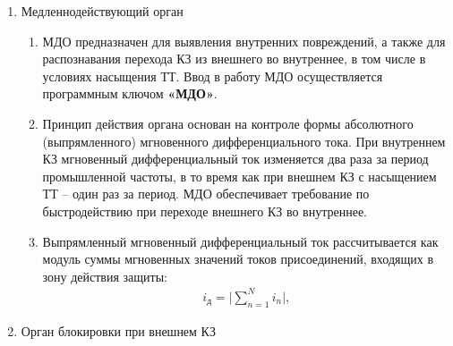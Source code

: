 \begin{enumerate}[label=\arabic{section}.\arabic{subsection}.\arabic{enumi}, labelsep=4pt, leftmargin=0pt, itemindent=57pt, itemsep=0pt, parsep=5pt]
\begin{enumerate}[label=\arabic{section}.\arabic{subsection}.\arabic{enumi}.\arabic*, labelsep=4pt, leftmargin=0em, itemindent=65pt, parsep=0pt]
\item
В алгоритме БДО реализована логика выявления одновременного нарастания фронтов действующих значений дифференциального и тормозного токов.
Сигнал срабатывания БДО формируется при наличии превышении дифференциального тока уставки срабатывания ДОТХ и нарастанием фронтов дифференциального и тормозного токов в пределах заданного времени.

\end{enumerate}


\item Медленнодействующий орган

\begin{enumerate}[label=\arabic{section}.\arabic{subsection}.\arabic{enumi}.\arabic*, labelsep=4pt, leftmargin=0em, itemindent=65pt, parsep=0pt]

\item
МДО предназначен для выявления внутренних повреждений, а также для распознавания перехода КЗ из внешнего во внутреннее, в том числе в условиях насыщения ТТ.
Ввод в работу МДО осуществляется программным ключом \textbf{«МДО»}.

\item
Принцип действия органа основан на контроле формы абсолютного (выпрямленного) мгновенного дифференциального тока.
При внутреннем КЗ мгновенный дифференциальный ток изменяется два раза за период промышленной частоты, в то время как при внешнем КЗ с насыщением ТТ – один раз за период.
МДО обеспечивает требование по быстродействию при переходе внешнего КЗ во внутреннее.

\item
Выпрямленный мгновенный дифференциальный ток рассчитывается как модуль суммы мгновенных значений токов присоединений, входящих в зону действия защиты:
\begin{align}
i_\textit{д}=\mid \sum_{n=1}^N i_{n} \mid,
\end{align}

\end{enumerate}


\item Орган блокировки при внешнем КЗ


\end{enumerate}
